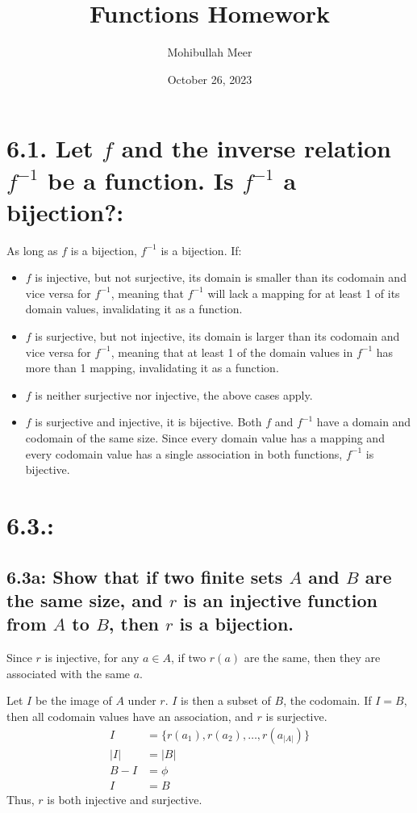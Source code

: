 \documentclass{article}
\title{Functions Homework}
\author{Mohibullah Meer}
\date{October 26, 2023}
\begin{document}
\maketitle
\section*{6.1. Let $f$ and the inverse relation $f^{-1}$ be a function. Is $f^{-1}$ a bijection?:}
As long as $f$ is a bijection, $f^{-1}$ is a bijection. If:
\begin{itemize}
\item $f$ is injective, but not surjective, its domain is smaller than its codomain and vice versa for $f^{-1}$, meaning that $f^{-1}$ will lack a mapping for at least 1 of its domain values, invalidating it as a function.
\item $f$ is surjective, but not injective, its domain is larger than its codomain and vice versa for $f^{-1}$, meaning that at least 1 of the domain values in $f^{-1}$ has more than 1 mapping, invalidating it as a function.
\item $f$ is neither surjective nor injective, the above cases apply.
\item $f$ is surjective and injective, it is bijective. Both $f$ and $f^{-1}$ have a domain and codomain of the same size. Since every domain value has a mapping and every codomain value has a single association in both functions, $f^{-1}$ is bijective.
\end{itemize}
\section*{6.3.:}
\subsection*{6.3a: Show that if two finite sets $A$ and $B$ are the same size, and $r$ is an injective function from $A$ to $B$, then $r$ is a bijection.}
Since $r$ is injective, for any $a\in A$, if two $r(a)$ are the same, then they are associated with the same $a$.

Let $I$ be the image of $A$ under $r$. $I$ is then a subset of $B$, the codomain. If $I=B$, then all codomain values have an association, and $r$ is surjective.
\begin{align*}
  I&=\{r(a_1),r(a_2),\ldots,r(a_{|A|})\}\\
  |I|&=|B|\\
  B-I&=\phi\\
  I&=B
\end{align*}
Thus, $r$ is both injective and surjective.
\end{document}
